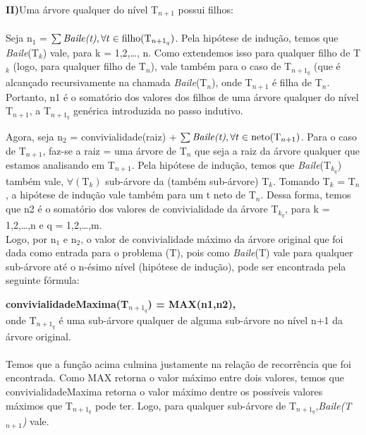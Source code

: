 \documentclass[a4paper]{article}
\begin{document}
\textbf{II)}Uma árvore qualquer do nível T$_{n+1}$ possui filhos:
\paragraph{}Seja n$_1$ = $\sum \text{\emph{Baile(t)}}, \forall t \in \text{filho(T$_{n+1_q}$)}$. Pela hipótese de indução, temos que \emph{Baile}(T$_k$) vale, para k = 1,2,\ldots, n. Como extendemos isso para qualquer filho de T$_k$ (logo, para qualquer filho de T$_n$), vale também para o caso de T$_{n+1_q}$ (que é alcançado recursivamente na chamada \emph{Baile}(T$_n$), onde T$_{n+1}$ é filha de T$_n$.  Portanto, n1 é o somatório dos valores dos filhos de uma árvore qualquer do nível T$_{n+1}$, a T$_{n+1_q}$ genérica introduzida no passo indutivo.

Agora, seja n$_2$ = convivialidade(raiz) + $\sum \text{\emph{Baile(t)}}, \forall t \in \text{neto(T$_{n+1}$)}$. Para o caso de T$_{n+1}$, faz-se a raiz = uma árvore de T$_n$ que seja a raiz da árvore qualquer que estamos analisando em T$_{n+1}$. Pela hipótese de indução, temos que \emph{Baile}(T$_{k_q}$) também vale, $\forall(\text{T}_k)$  sub-árvore da (também sub-árvore) T$_k$. Tomando T$_k$ = T$_n$, a hipótese de indução vale também para um t neto de T$_n$. Dessa forma, temos que n2 é o somatório dos valores de convivialidade da árvore T$_{k_q}$, para k = 1,2,\ldots,n e q = 1,2,\ldots,m.\\
Logo, por n$_1$ e n$_2$, o valor de convivialidade máximo da árvore original que foi dada como entrada para o problema (T), pois como \emph{Baile}(T) vale para qualquer sub-árvore até o n-ésimo nível (hipótese de indução), pode ser encontrada pela seguinte fórmula:\\
\begin{center} \textbf{convivialidadeMaxima(T$_{n+1_q}$) =  MAX(n1,n2),} \\onde T$_{n+1_q}$ é uma sub-árvore qualquer de alguma sub-árvore no nível n+1 da árvore original.\\
\end{center}

\paragraph{}Temos que a função acima culmina justamente na relação de recorrência que foi encontrada. Como MAX retorna o valor máximo entre dois valores, temos que convivialidadeMaxima retorna o valor máximo dentre os possíveis valores máximos que T$_{n+1_q}$ pode ter. Logo, para qualquer sub-árvore de T$_{n+1_q}$,\emph{Baile(T$_{n+1}$)} vale.
\end{document}
